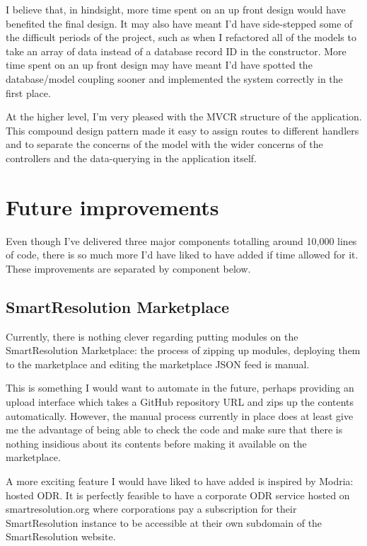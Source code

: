 I believe that, in hindsight, more time spent on an up front design would have benefited the final design. It may also have meant I'd have side-stepped some of the difficult periods of the project, such as when I refactored all of the models to take an array of data instead of a database record ID in the constructor. More time spent on an up front design may have meant I'd have spotted the database/model coupling sooner and implemented the system correctly in the first place.

At the higher level, I'm very pleased with the MVCR structure of the application. This compound design pattern made it easy to assign routes to different handlers and to separate the concerns of the model with the wider concerns of the controllers and the data-querying in the application itself.

\section{Future improvements}

Even though I've delivered three major components totalling around 10,000 lines of code, there is so much more I'd have liked to have added if time allowed for it. These improvements are separated by component below.

\subsection{SmartResolution Marketplace}

Currently, there is nothing clever regarding putting modules on the SmartResolution Marketplace: the process of zipping up modules, deploying them to the marketplace and editing the marketplace JSON feed is manual.

This is something I would want to automate in the future, perhaps providing an upload interface which takes a GitHub repository URL and zips up the contents automatically. However, the manual process currently in place does at least give me the advantage of being able to check the code and make sure that there is nothing insidious about its contents before making it available on the marketplace.

A more exciting feature I would have liked to have added is inspired by Modria: hosted ODR. It is perfectly feasible to have a corporate ODR service hosted on smartresolution.org where corporations pay a subscription for their SmartResolution instance to be accessible at their own subdomain of the SmartResolution website.

